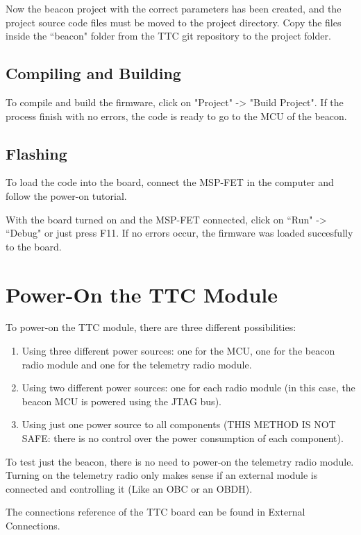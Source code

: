 Now the beacon project with the correct parameters has been created, and the project source code files must be moved to the project directory. Copy the files inside the ``beacon" folder from the TTC git repository to the project folder.

\subsection{Compiling and Building}

To compile and build the firmware, click on "Project" -> "Build Project". If the process finish with no errors, the code is ready to go to the MCU of the beacon.

\subsection{Flashing}

To load the code into the board, connect the MSP-FET in the computer and follow the power-on tutorial.

With the board turned on and the MSP-FET connected, click on ``Run" -> ``Debug" or just press F11. If no errors occur, the firmware was loaded succesfully to the board.

\section{Power-On the TTC Module}

To power-on the TTC module, there are three different possibilities:

\begin{enumerate}
    \item Using three different power sources: one for the MCU, one for the beacon radio module and one for the telemetry radio module.
    \item Using two different power sources: one for each radio module (in this case, the beacon MCU is powered using the JTAG bus).
    \item Using just one power source to all components (THIS METHOD IS NOT SAFE: there is no control over the power consumption of each component).
\end{enumerate}

To test just the beacon, there is no need to power-on the telemetry radio module. Turning on the telemetry radio only makes sense if an external module is connected and controlling it (Like an OBC or an OBDH).

The connections reference of the TTC board can be found in External Connections.

